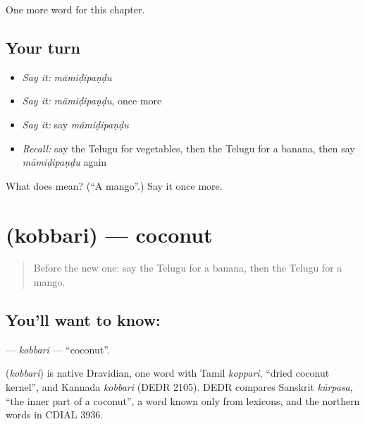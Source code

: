 \begin{grammarlens}[title={What you've built}]
One more word for this chapter.
\end{grammarlens}

\subsection*{Your turn}
\begin{itemize}
\raggedright
  \item \emph{Say it:} \emph{māmiḍipaṇḍu}
  \item \emph{Say it:} \emph{māmiḍipaṇḍu}, once more
  \item \emph{Say it:} say \emph{māmiḍipaṇḍu}
  \item \emph{Recall:} say the Telugu for vegetables, then the Telugu for a banana, then say \emph{māmiḍipaṇḍu} again
\end{itemize}

\begin{tcolorbox}[breakable,colback=teal!4,colframe=teal!35!black,title={Before you move on}]
What does  mean? (\textquotedblleft{}A mango\textquotedblright{}.) Say it once more.
\end{tcolorbox}
\section[\texorpdfstring{\te{కొబ్బరి} (kobbari)}{కొబ్బరి (kobbari)}]{ (kobbari) — coconut}

\label{lesson:TE-C117-kobbari}



\begin{quote}
Before the new one: say the Telugu for a banana, then the Telugu for a mango.
\end{quote}

\subsection*{You'll want to know: }
\textbf{} — \emph{kobbari} — \textquotedblleft{}coconut\textquotedblright{}.

\begin{cousinweb}
\textbf{} (\emph{kobbari}) is native Dravidian, one word with Tamil \emph{koppari}, \textquotedblleft{}dried coconut kernel\textquotedblright{}, and Kannada \emph{kobbari} (DEDR 2105). DEDR compares Sanskrit \emph{kūrpasa}, \textquotedblleft{}the inner part of a coconut\textquotedblright{}, a word known only from lexicons, and the northern words in CDIAL 3936.
\end{cousinweb}

